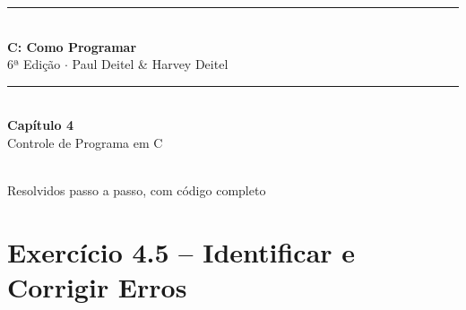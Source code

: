 \documentclass[12pt,a4paper]{article}
\begin{document}
\begin{titlepage}
  \centering\vspace*{2cm}
  {\color{deitelblue}\rule{\linewidth}{2pt}}\\[0.4cm]
  {\huge\bfseries\color{deitelblue}C: Como Programar}\\[0.2cm]
  {\large\color{deitelblue}6ª Edição $\cdot$ Paul Deitel \& Harvey Deitel}\\[0.2cm]
  {\color{deitelblue}\rule{\linewidth}{2pt}}\\[1cm]
  {\LARGE\bfseries Capítulo 4}\\[0.3cm]
  {\Large\color{deitelblue!80}Controle de Programa em C}\\[0.8cm]
  \begin{tcolorbox}[colback=deitellightblue,colframe=deitelblue,width=0.85\linewidth]
    \\[0.2cm]
    {\normalsize Resolvidos passo a passo, com código completo}
  \end{tcolorbox}
\end{titlepage}

\tableofcontents\newpage

\section{Exercício 4.5 -- Identificar e Corrigir Erros}
\end{document}
